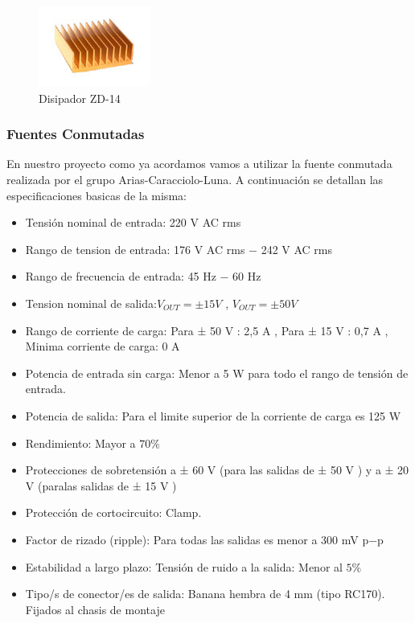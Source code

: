 \documentclass[a4paper,12pt,twoside]{article}
\begin{document}
\begin{figure}[H]
    \centering
    \includegraphics[height=0.4\textwidth]{img/zd14.jpg}
    \caption{Disipador ZD-14}
    \label{fig:diszd14}
\end{figure}

\subsubsection{Fuentes Conmutadas}
\label{sec:fuente}

En nuestro proyecto como ya acordamos vamos a utilizar la fuente conmutada realizada por el grupo Arias-Caracciolo-Luna.
A continuación se detallan las especificaciones basicas de la misma:

\begin{itemize}
\item{Tensión nominal de entrada: 220 V AC rms}
\item{Rango de tension de entrada: 176 V AC rms − 242 V AC rms}
\item{Rango de frecuencia de entrada: 45 Hz − 60 Hz}
\item{Tension nominal de salida:$ V_{OUT} = ± 15 V$ , $V_{OUT} = ± 50 V$}
\item{Rango de corriente de carga: Para ± 50 V : 2,5 A , Para ± 15 V : 0,7 A , Minima corriente de carga: 0 A}
\item{Potencia de entrada sin carga: Menor a 5 W para todo el rango de tensión de entrada.}
\item{Potencia de salida: Para el limite superior de la corriente de carga es 125 W}
\item{Rendimiento: Mayor a $70\%$}
\item{Protecciones de sobretensión a ± 60 V (para las salidas de ± 50 V ) y a ± 20 V (paralas salidas de ± 15 V )}
\item{Protección de cortocircuito: Clamp.}
\item{Factor de rizado (ripple): Para todas las salidas es menor a 300 mV p−p}
\item{Estabilidad a largo plazo: Tensión de ruido a la salida: Menor al $5\%$}
\item{Tipo/s de conector/es de salida: Banana hembra de 4 mm  (tipo RC170). Fijados al chasis de montaje}
\end{itemize}
\end{document}
